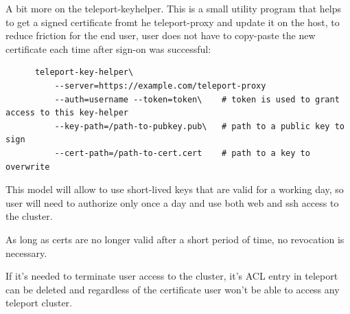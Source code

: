 \documentclass{res}
\begin{document}
\begin{resume}
    A bit more on the teleport-keyhelper. This is a small utility program that helps to get a signed certificate fromt he teleport-proxy and update
    it on the host, to reduce friction for the end user, user does not have to copy-paste the new certificate each time after sign-on was successful:
    \begin{verbatim}
      teleport-key-helper\
          --server=https://example.com/teleport-proxy
          --auth=username --token=token\    # token is used to grant access to this key-helper
          --key-path=/path-to-pubkey.pub\   # path to a public key to sign
          --cert-path=/path-to-cert.cert    # path to a key to overwrite
    \end{verbatim}

    This model will allow to use short-lived keys that are valid for a working day, so user will need to authorize only once a day
    and use both web and ssh access to the cluster.

    As long as certs are no longer valid after a short period of time, no revocation is necessary.

    If it's needed to terminate user access to the cluster, it's ACL entry in teleport can be deleted and regardless of the certificate
    user won't be able to access any teleport cluster.

\end{resume}
\end{document}
